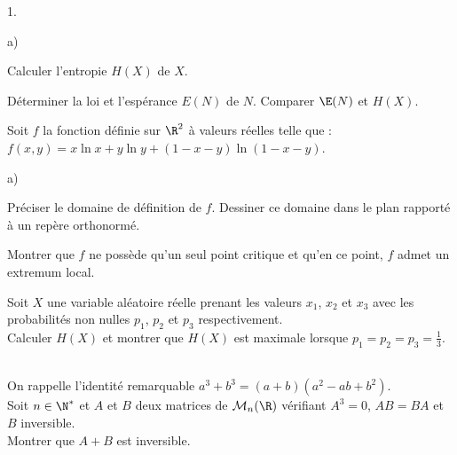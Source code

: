 \documentclass[11pt]{article}%
\begin{document}
\begin{exerciceAP}
\begin{noliste}{1.}
    \begin{noliste}{a)}
    \setlength{\itemsep}{2mm}
    \item Calculer l'entropie $H(X)$ de $X$.
    \item Déterminer la loi et l'espérance $E (N)$ de $N$. Comparer
      $\E(N)$ et $H(X)$.
    \end{noliste}

  \item Soit $f$ la fonction définie sur $\R^2$ à valeurs réelles
    telle que : $f(x,y) = x \ln x + y \ln y + (1-x-y) \ln
    (1-x-y)$. 
    \begin{noliste}{a)}
    \setlength{\itemsep}{2mm}
    \item Préciser le domaine de définition de $f$. Dessiner ce
      domaine dans le plan rapporté à un repère orthonormé.
    \item Montrer que $f$ ne possède qu'un seul point critique et
      qu'en ce point, $f$ admet un extremum local.
    \item Soit $X$ une variable aléatoire réelle prenant les valeurs
      $x_1$, $x_2$ et $x_3$ avec les probabilités non nulles $p_1$,
      $p_2$ et $p_3$ respectivement.\\

      Calculer $H(X)$ et montrer que $H(X)$ est maximale lorsque
      $p_1=p_2=p_3 = \frac{1}{3}$.
    \end{noliste}   
  \end{noliste}
\end{exerciceAP}


\begin{exerciceSP}~\\
  On rappelle l'identité remarquable $a^3 + b^3 = (a+b) (a^2 - a b +
  b^2)$.\\
  Soit $n \in \N^*$ et $A$ et $B$ deux matrices de $\mathcal{M}_n ( \R
  )$ vérifiant $A^3 = 0$, $A B = B A$ et $B$ inversible. \\
  Montrer que $A + B$ est inversible.
\end{exerciceSP}




\end{document}
